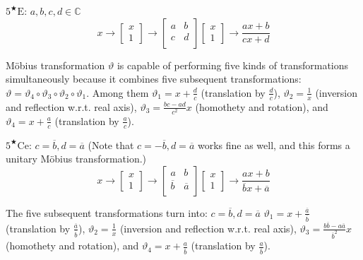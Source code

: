\documentclass[11pt]{article}
\begin{document}
$5^{\bigstar}\mathrm{E}$: $a,b,c,d\in \mathbb{C}$
\[
    x \rightarrow
    \begin{bmatrix}
        x\\
        1
    \end{bmatrix}
    \rightarrow
    \begin{bmatrix}
        a&b\\
        c&d\\
    \end{bmatrix}
    \begin{bmatrix}
        x\\
        1
    \end{bmatrix}
    \rightarrow
    \frac{ax+b}{cx+d} 
    \]

Möbius transformation $\vartheta$ is capable of performing five kinds of transformations simultaneously
because it combines five subsequent transformations:
$\vartheta=\vartheta_4 \circ \vartheta_3 \circ \vartheta_2 \circ \vartheta_1$.
Among them
$\vartheta_1=x+\frac{d}{c}$
(translation by $\frac{d}{c}$),
$\vartheta_2=\frac{1}{x}$
(inversion and reflection w.r.t. real axis),
$\vartheta_3=\frac{bc-ad}{c^2} x$
(homothety and rotation), and
$\vartheta_4=x+\frac{a}{c}$
(translation by $\frac{a}{c}$).

$5^{\bigstar}\mathrm{Ce}$: 
$c = \overline{b}, d = \overline{a}$
(Note that $c = -\overline{b}, d = \overline{a}$ works fine as well, and this forms a unitary Möbius transformation.)
\[
    x \rightarrow
    \begin{bmatrix}
        x\\
        1
    \end{bmatrix}
    \rightarrow
    \begin{bmatrix}
        a & b\\
        \overline{b} & \overline{a}\\
    \end{bmatrix}
    \begin{bmatrix}
        x\\
        1
    \end{bmatrix}
    \rightarrow
    \frac{ax+b}{\overline{b}x+\overline{a}} 
    \]

The five subsequent transformations turn into:
$c = \overline{b}, d = \overline{a}$
$\vartheta_1=x+\frac{\overline{a}}{\overline{b}}$
(translation by $\frac{\overline{a}}{\overline{b}}$),
$\vartheta_2=\frac{1}{x}$
(inversion and reflection w.r.t. real axis),
$\vartheta_3=\frac{b\overline{b}-a\overline{a}}{\overline{b}^2} x$
(homothety and rotation), and
$\vartheta_4=x+\frac{a}{\overline{b}}$
(translation by $\frac{a}{\overline{b}}$).
\end{document}
